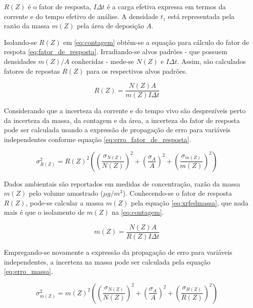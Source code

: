 $R(Z)$ é o fator de resposta, $I\Delta t$ é a carga efetiva expressa
em termos da corrente e do tempo efetivo de análise.
A densidade $t_z$ está representada pela razão da massa $m(Z)$ pela 
área de deposição $A$.

Isolando-se $R(Z)$ em \ref{eq:contagem} obtém-se a equação para cálculo 
do fator de respota \ref{eq:fator_de_resposta}.
Irradiando-se alvos padrões - que possuem densidades $m(Z)/A$ conhecidas - 
mede-se $N(Z)$ e $I \Delta t$. Assim, são calculados fatores de repostas $R(Z)$ 
para os respectivos alvos padrões. 

\begin{equation}
  \label{eq:fator_de_resposta}
  R(Z) = \frac{N(Z) A}{m(Z)I \Delta t}
\end{equation}

Considerando que a incerteza da corrente e do tempo vivo são
desprezíveis perto da incerteza da massa, da contagem e da área, 
a incerteza do fator de resposta pode ser calculada usando a expressão
de propagação de erro para variáveis independentes conforme equação 
\ref{eq:erro_fator_de_resposta}.

\begin{equation}
  \label{eq:erro_fator_de_resposta}
  \sigma_{R(Z)}^2 = {R(Z)}^2 \left( \left(\frac{\sigma_{N(Z)}}{N(Z)}\right)^2 + 
                                  \left(\frac{\sigma_A}{A}\right)^2 + 
                                  \left(\frac{\sigma_{m(Z)}}{m(Z)}\right)^2 
                             \right)
\end{equation}

Dados ambientais são reportados em medidas de concentração,
razão da massa $m(Z)$ pelo volume amostrado ($\mu g/m^3$).
Conhecendo-se o fator de resposta $R(Z)$, pode-se calcular a massa $m(Z)$ 
pela equação \ref{eq:xrfedmassa}, que nada mais é que o isolamento de $m(Z)$ na 
\ref{eq:contagem}. 

\begin{equation}
  \label{eq:xrfedmassa}
  m(Z) = \frac{N(Z) A}{ R(Z)I \Delta t}
\end{equation}

Empregando-se novamente a expressão da propagação de erro para variáveis independentes, 
a incerteza na massa pode ser calculada pela equação \ref{eq:erro_massa}.

\begin{equation}
  \label{eq:erro_massa}
  \sigma_{m(Z)}^2 = {m(Z)}^2 \left( \left(\frac{\sigma_{N(Z)}}{N(Z)}\right)^2 + 
                                  \left(\frac{\sigma_A}{A}\right)^2 + 
                                  \left(\frac{\sigma_{R(Z)}}{R(Z)}\right)^2 
                             \right)
\end{equation}



